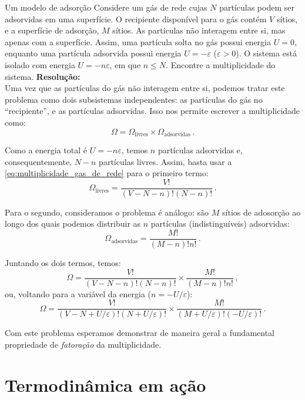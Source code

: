     \begin{solved}{Um modelo de adsorção}{}
        Considere um gás de rede cujas $N$ partículas podem ser adsorvidas em uma superfície. O recipiente disponível para o gás contém $V$ sítios, e a superfície de adsorção, $M$ sítios. As partículas não interagem entre si, mas apenas com a superfície. Assim, uma partícula solta no gás possui energia $U=0$, enquanto uma partícula adsorvida possui energia $U=-\varepsilon$ ($\varepsilon>0$). O sistema está isolado com energia $U=-n\varepsilon$, em que $n\leq N$. Encontre a multiplicidade do sistema.
        \tcblower
        \noindent\textbf{Resolução:}\\
        \indent Uma vez que as partículas do gás não interagem entre si, podemos tratar este problema como dois subsistemas independentes: as partículas do gás no ``recipiente'', e as partículas adsorvidas. Isso nos permite escrever a multiplicidade como:
        \[ \Omega = \Omega_{\text{livres}}\times\Omega_{\text{adsorvidas}}\,. \]

        Como a energia total é $U=-n\varepsilon$, temos $n$ partículas adsorvidas e, consequentemente, $N-n$ partículas livres. Assim, basta usar a \cref{eq:multiplicidade_gas_de_rede} para o primeiro termo:
        \[ \Omega_{\text{livres}} = \frac{V!}{(V-N-n)!(N-n)!}\,.\]

        Para o segundo, consideramos o problema é análogo: são $M$ sítios de adosorção ao longo dos quais podemos distribuir as $n$ partículas (indistinguíveis) adsorvidas:
        \[ \Omega_{\text{adsorvidas}} = \frac{M!}{(M-n)!n!}\,.\]

        Juntando os dois termos, temos:
        \begin{equation}
            \Omega = \frac{V!}{(V-N-n)!(N-n)!}\times\frac{M!}{(M-n)!n!}\,,
        \end{equation}
        ou, voltando para a variável da energia ($n=-U/\varepsilon$):
        \begin{equation}
            \Omega = \frac{V!}{(V-N+U/\varepsilon)!(N+U/\varepsilon)!}\times\frac{M!}{(M+U/\varepsilon)!(-U/\varepsilon)!}\,.
        \end{equation}

        Com este problema esperamos demonstrar de maneira geral a fundamental propriedade de \textit{fatoração} da multiplicidade.
    \end{solved}

\section{Termodinâmica em ação}

